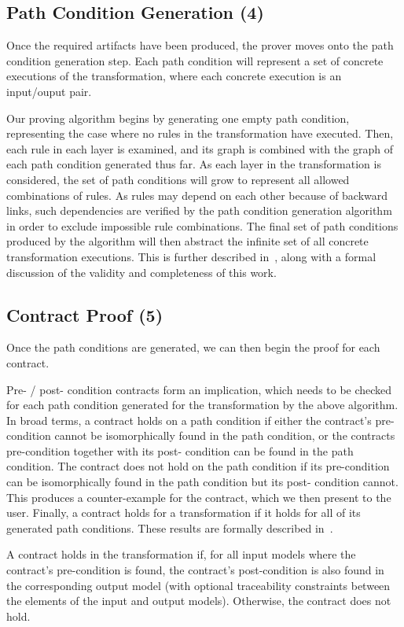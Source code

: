 \subsection{Path Condition Generation (4)}

Once the required artifacts have been produced, the prover moves onto the path condition generation step.  Each
path condition will represent a set of concrete executions
of the transformation, where each concrete execution is an
input/ouput pair.

Our proving algorithm begins by generating one empty
path condition, representing the case where no rules in the
transformation have executed. Then, each rule in each layer
is examined, and its graph is combined with the graph of
each path condition generated thus far. As each layer in the
transformation is considered, the set of path conditions will
grow to represent all allowed combinations of rules. As rules
may depend on each other because of backward links, such
dependencies are verified by the path condition generation
algorithm in order to exclude impossible rule combinations.
The final set of path conditions produced by the algorithm
will then abstract the infinite set of all concrete transformation
executions. This is further described in~\cite{Lucio2014}, along with a
formal discussion of the validity and completeness of this
work.

\subsection{Contract Proof (5)}

Once the path conditions are generated, we can then begin the proof for each contract.

Pre- / post- condition contracts form an implication, which
needs to be checked for each path condition generated for
the transformation by the above algorithm. In broad terms,
a contract holds on a path condition if either the contract’s
pre-condition cannot be isomorphically found in the path
condition, or the contracts pre-condition together with its post-
condition can be found in the path condition. The contract
does not hold on the path condition if its pre-condition can
be isomorphically found in the path condition but its post-
condition cannot. This produces a counter-example for the contract, which we then present to the user. Finally, a contract holds for a transformation if it holds for all of its generated path conditions. These results
are formally described in~\cite{Lucio2014}.

A contract holds in the transformation if, for all input models where the contract's pre-condition is found, the contract's post-condition is also found in the corresponding output model (with optional traceability constraints between the elements of the input and output models). Otherwise, the contract does not hold.


